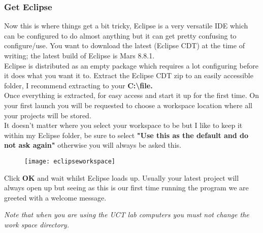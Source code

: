 {{\subsubsection{Get Eclipse}
Now this is where things get a bit tricky, Eclipse is a very versatile IDE which can be configured to do almost anything but it can get pretty confusing to configure/use.
You want to download the latest {\color{Blue}\underline{}} (Eclipse CDT) at the time of writing; the latest build of Eclipse is Mars 8.8.1.\\
Eclipse is distributed as an empty package which requires a lot configuring before it does what you want it to. Extract the Eclipse CDT zip to an easily accessible folder, I recommend extracting to your \textbf{\color{Aquamarine} C:\textbackslash file.}
\\
\newpage
Once everything is extracted, \underline{} for easy access and start it up for the first time. On your first launch you will be requested to choose a workspace location where all your projects will be stored. 
\\
\justifying
It doesn't matter where you select your workspace to be but I like to keep it within my Eclipse folder, be sure to select \textbf{"Use this as the default and do not ask again"} otherwise you will always be asked this.
\begin{figure}[htbp]
\centering
\texttt{[image: eclipseworkspace]}
\end{figure}
\par
Click \textbf{\color{Purple}OK} and wait whilst Eclipse loads up. Usually your latest project will always open up but seeing as this is our first time running the program we are greeted with a welcome message.
\begin{minipage}{\textwidth}
\emph{\color{Gray} Note that when you are using the UCT lab computers you must not change the work space directory.}
\end{minipage}
\centering
{}}}
